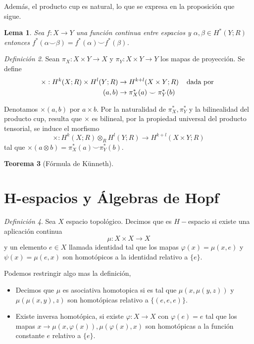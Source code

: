\documentclass[aop]{imsart2}
\theoremstyle{plain}
\newtheorem{teo}{Teorema}[section]
\newtheorem{lema}[teo]{Lema}
\theoremstyle{remark}
\newtheorem{dfn}[teo]{Definición}
\newcommand{\htext}[1]{\hspace{4mm}\text{#1 }}
\begin{document}
\noindent Además, el producto cup es natural, lo que se expresa en la proposición que sigue.

\begin{lema}
    Sea $f:X\to Y$ una función continua entre espacios y $\alpha,\beta\in H^{*}(Y;R)$ entonces
    $f^{*}(\alpha\smile\beta)=f^{*}(\alpha)\smile f^{*}(\beta)$.
\end{lema}

\begin{dfn}
    Sean $\pi_{X}:X\times Y\to X$ y $\pi_{Y}:X\times Y\to Y$ los mapas de proyección. Se define
    \begin{align*}
        \times:H^{k}(X;R)\times H^{l}(Y;R) &\to H^{k+l}(X\times Y;R)
        \htext{dada por} \\
        (a,b) &\to \pi_{X}^{*}(a)\smile\pi_{Y}^{*}(b)
    \end{align*}
\end{dfn}

\noindent Denotamos $\times(a,b)$ por $a\times b$. Por la naturalidad de $\pi_{X}^{*}, 
\pi_{Y}^{*}$ y la bilinealidad del producto cup, resulta que $\times$ es bilineal, por la 
propiedad universal del producto tensorial, se induce el morfismo
\begin{equation*}
    \times:H^{k}(X;R)\otimes_{R}H^{l}(Y;R)\to H^{k+l}(X\times Y;R)
\end{equation*}
tal que $\times(a\otimes b)=\pi_{X}^{*}(a)\smile\pi_{Y}^{*}(b)$.

\begin{teo}[Fórmula de Künneth]
    
\end{teo}

\section{H-espacios y Álgebras de Hopf}

\begin{dfn}
    Sea $X$ espacio topológico. Decimos que es $H-$espacio si existe una aplicación continua
    \begin{equation*}
        \mu:X\times X\to X
    \end{equation*}
    y un elemento $e\in X$ llamada identidad tal que los mapas $\varphi(x)=\mu(x,e)$ y 
    $\psi(x)=\mu(e,x)$ son homotópicos a la identidad relativo a $\{e\}$.
\end{dfn}

\noindent Podemos restringir algo mas la definición,
\begin{itemize}
    \item Decimos que $\mu$ es asociativa homotopica si es tal que $\mu(x,\mu(y,z))$ y 
    $\mu(\mu(x,y),z)$ son homotópicas relativo a $\{(e,e,e)\}$.

    \item Existe inversa homotópica, si existe $\varphi:X\to X$ con $\varphi(e)=e$ tal que los
    mapas $x\to\mu(x,\varphi(x)),\mu(\varphi(x),x)$ son homotópicas a la función constante $e$
    relativo a $\{e\}$.
\end{itemize}
\end{document}
